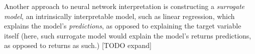 			Another approach to neural network interpretation is constructing a \textit{surrogate model}, an intrinsically interpretable model, such as linear regression, which explains the model's \textit{predictions}, as opposed to explaining the target variable itself (here, such surrogate model would explain the model's returns predictions, as opposed to returns as such.) [TODO expand] 
		 

	

